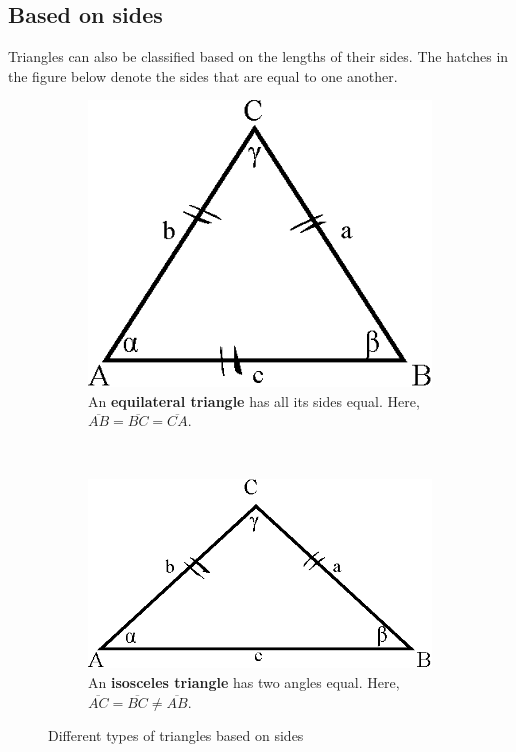 \documentclass[11pt]{article}
\begin{document}
\subsection{Based on sides}
Triangles can also be classified based on the lengths of their sides. The hatches in the figure below denote the sides that are equal to one another.
\begin{figure}[!htbp]
    \centering
    \begin{subfigure}[t]{0.49\textwidth}
        \centering
        \includegraphics[scale=0.7]{equilateral_triangle.eps}
        \caption{An \textbf{equilateral triangle} has all its sides equal. Here, $\overline{AB} = \overline{BC} = \overline{CA}$.}
        \label{fig:equilateral_triangle}
    \end{subfigure}
    ~
    \begin{subfigure}[t]{0.49\textwidth}
        \centering
        \includegraphics[scale=0.7]{isosceles.eps}
        \caption{An \textbf{isosceles triangle} has two angles equal. Here, $\overline{AC} = \overline{BC} \neq \overline{AB}$.}
        \label{fig:isosceles_triangle}
    \end{subfigure}%
    \caption{Different types of triangles based on sides}
\end{figure}
\FloatBarrier
\end{document}
